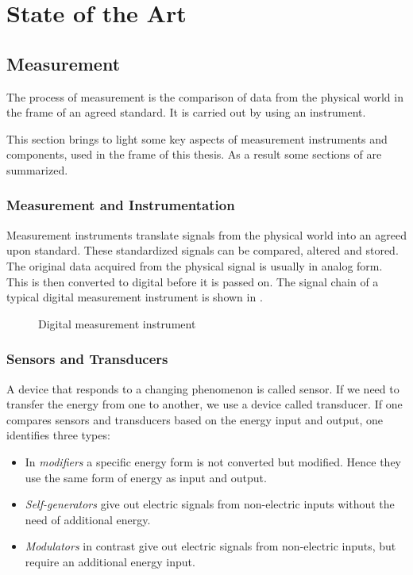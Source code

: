 \chapter{State of the Art}
\label{chap:\currfilebase}

\section{Measurement}
The process of measurement is the comparison of data from the physical world in the frame of an agreed standard. It is carried out by using an instrument.

This section brings to light some key aspects of measurement instruments and components, used in the frame of this thesis. As a result some sections of \cite{webster2018measurement} are summarized.

\subsection{Measurement and Instrumentation}

Measurement instruments translate signals from the physical world into an agreed upon standard. These standardized signals can be compared, altered and stored.
The original data acquired from the physical signal is usually in analog form. This is then converted to digital before it is passed on. The signal chain of a typical digital measurement instrument is shown in .

\begin{figure}[!htb]
    \centering
    
    \caption[Digital instrument]{Digital measurement instrument}
    \label{fig:digital_instrument}
\end{figure}

\subsection{Sensors and Transducers}
A device that responds to a changing phenomenon is called sensor. If we need to transfer the energy from one to another, we use a device called transducer. If one compares sensors and transducers based on the energy input and output, one identifies three types:
\begin{itemize}
    \item In \emph{modifiers} a specific energy form is not converted but modified. Hence they use the same form of energy as input and output.
    \item \emph{Self-generators} give out electric signals from non-electric inputs without the need of additional energy.
    \item \emph{Modulators} in contrast give out electric signals from non-electric inputs, but require an additional energy input.
\end{itemize}

